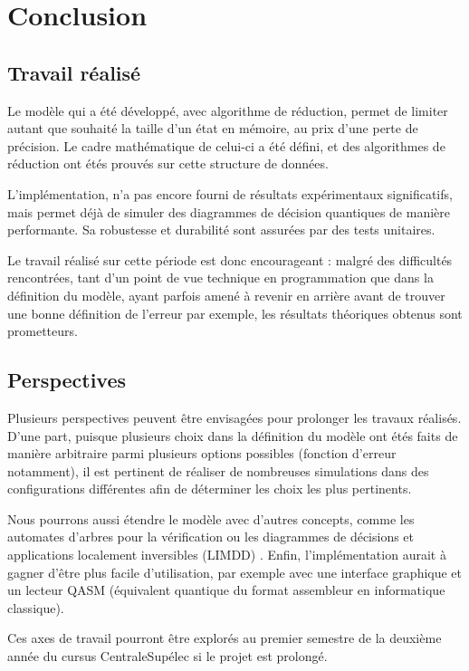 
\chapter{Conclusion} %
\label{ch:Conclusion}

\section{Travail réalisé}

Le modèle qui a été développé, avec algorithme de réduction, permet de limiter autant que souhaité la taille d'un état en mémoire, au prix d'une perte de précision. Le cadre mathématique de celui-ci a été défini, et des algorithmes de réduction ont étés prouvés sur cette structure de données.

L'implémentation, n'a pas encore fourni de résultats expérimentaux significatifs, mais permet déjà de simuler des diagrammes de décision quantiques de manière performante. Sa robustesse et durabilité sont assurées par des tests unitaires.

Le travail réalisé sur cette période est donc encourageant : malgré des difficultés rencontrées, tant d'un point de vue technique en programmation que dans la définition du modèle, ayant parfois amené à revenir en arrière avant de trouver une bonne définition de l'erreur par exemple, les résultats théoriques obtenus sont prometteurs.

\section{Perspectives}

Plusieurs perspectives peuvent être envisagées pour prolonger les travaux réalisés. D'une part, puisque plusieurs choix dans la définition du modèle ont étés faits de manière arbitraire parmi plusieurs options possibles (fonction d'erreur notamment), il est pertinent de réaliser de nombreuses simulations dans des configurations différentes afin de déterminer les choix les plus pertinents.

Nous pourrons aussi étendre le modèle avec d'autres concepts, comme les automates d'arbres pour la vérification \cite{Chen_2023} ou les diagrammes de décisions et applications localement inversibles (LIMDD) \cite{Vinkhuijzen_2023}. Enfin, l'implémentation aurait à gagner d'être plus facile d'utilisation, par exemple avec une interface graphique et un lecteur QASM (équivalent quantique du format assembleur en informatique classique).

Ces axes de travail pourront être explorés au premier semestre de la deuxième année du cursus CentraleSupélec si le projet est prolongé.